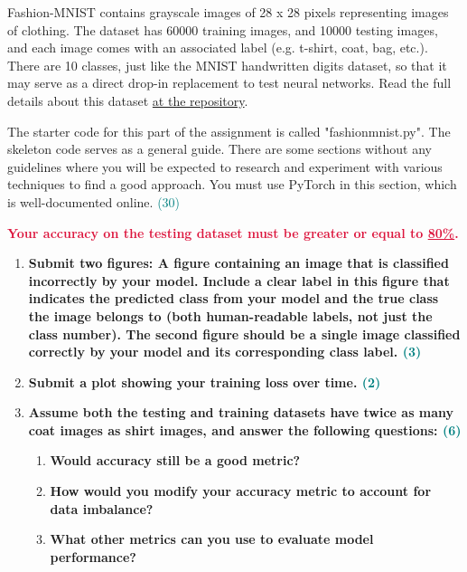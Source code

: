\documentclass[a4paper]{article}
\begin{document}
\begin{sloppypar}
\vspace{\baselineskip}

\noindent Fashion-MNIST contains grayscale images of 28 x 28 pixels representing images of clothing. 
The dataset has 60000 training images, and 10000 testing images, and each image
comes with an associated label (e.g. t-shirt, coat, bag, etc.). There are 10 classes, just
like the MNIST handwritten digits dataset, so that it may serve as a direct drop-in replacement 
to test neural networks. Read the full details about this dataset \href{https://github.com/zalandoresearch/fashion-mnist}{at the repository}.

\vspace{\baselineskip}

\noindent The starter code for this part of the assignment is called "fashionmnist.py". The skeleton
code serves as a general guide. There are some sections without any guidelines where
you will be expected to research and experiment with various techniques to find a good
approach. You must use PyTorch in this section, which is well-documented online. \hfill \textcolor{teal}{(30)}

\vspace{\baselineskip}

\noindent \textbf{\textcolor{crimson}{Your accuracy on the testing dataset must be greater or equal to \underline{80\%}.}}

\vspace{\baselineskip}

\begin{enumerate}[start=4,label=Q\arabic*,left=0pt]
    \item \textbf{Submit two figures: A figure containing an image that is classified incorrectly by your
    model. Include a clear label in this figure that indicates the predicted class from your
    model and the true class the image belongs to (both human-readable labels, not just the
    class number). The second figure should be a single image classified correctly by your
    model and its corresponding class label. \hfill \textcolor{teal}{(3)}}

    \par

    \item \textbf{Submit a plot showing your training loss over time. \hfill \textcolor{teal}{(2)}}

    \par 

    \item \textbf{Assume both the testing and training datasets have twice as many coat images as
    shirt images, and answer the following questions: \hfill \textcolor{teal}{(6)}}
    \begin{enumerate}
        \item \textbf{Would accuracy still be a good metric?}
        \item \textbf{How would you modify your accuracy metric to account for data imbalance?}
        \item \textbf{What other metrics can you use to evaluate model performance?}
    \end{enumerate}


\end{enumerate}
\end{sloppypar}
\end{document}
